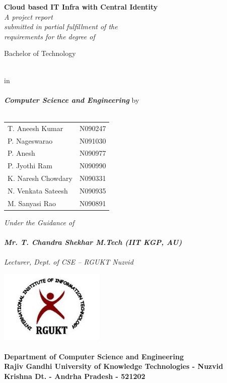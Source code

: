 \documentclass[12pt]{report}
\begin{document}
\begin{titlepage}
 \begin{center}
\LARGE
\textbf{Cloud based IT Infra with Central Identity} \\
\vfill
\small
\textit{A project report \\ submitted in partial fulfillment of the \\ requirements for the degree of  }\\
\vfill
\large
 {\LARGE{\degfntbf Bachelor of Technology} \par}
\small
\underline{}\\
in \\
\underline{}\\
\large
\textbf{\emph{Computer Science and Engineering}}
\vfill
\small
by \\
\underline{} \\
\vfill
\large
\begin{tabular}{l  l}
T. Aneesh Kumar & N090247  \\
P. Nageswarao  & N091030  \\
P. Anesh  & N090977  \\
P. Jyothi Ram & N090990  \\
K. Naresh Chowdary  & N090331  \\
N. Venkata Sateesh  & N090935  \\
M. Sanyasi Rao & N090891 
\end{tabular}
\vfill
\small
\textit{Under the Guidance of} \\
\large
\underline{} \\
\textit{\textbf{Mr. T. Chandra Shekhar M.Tech (IIT KGP, AU)}} \\
\underline{}\\
\small
\textit{Lecturer, Dept. of CSE -- RGUKT Nuzvid} \\
\small
\vfill


\includegraphics[width=5cm]{rgukt_logo.jpg} 
\Large
\underline{} \\
\underline{} \\
\normalsize
\textbf{Department of Computer Science and Engineering } \\
\textbf{Rajiv Gandhi University of Knowledge Technologies - Nuzvid }  \\
\textbf{Krishna Dt. - Andrha Pradesh - 521202}



\end{center}
\end{titlepage}
\end{document}
